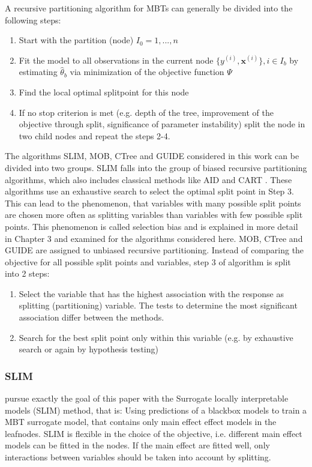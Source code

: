 A recursive partitioning algorithm for MBTs can generally be divided into the following steps:
\begin{enumerate}
    \item Start with the partition (node) $I_0 = 1,...,n$
    \item Fit the model to all observations in the current node $\{y^{(i)}, \mathbf{x}^{(i)}\}, i \in I_b$ by estimating $\hat{\theta}_b$ via minimization of the objective function $\Psi$
    \item Find the local optimal splitpoint for this node 
    \item If no stop criterion is met (e.g. depth of the tree, improvement of the objective through split, significance of parameter instability) split the node in two child nodes and repeat the steps 2-4.
\end{enumerate}


The algorithms SLIM, MOB, CTree and GUIDE considered in this work can be divided into two groups. SLIM falls into the group of biased recursive partitioning algorithms, which also includes classical methods like AID \citep{Morgan.1963} and CART \citep{Breiman.1984}. These algorithms use an exhaustive search to select the optimal split point in Step 3. This can lead to the phenomenon, that variables with many possible split points are chosen more often as splitting variables than variables with few possible split points. This phenomenon is called selection bias and is explained in more detail in Chapter 3 and examined for the algorithms considered here.
MOB, CTree and GUIDE are assigned to unbiased recursive partitioning. Instead of comparing the objective for all possible split points and variables, step 3 of algorithm is split into 2 steps:

\begin{enumerate}
    \item Select the variable that has the highest association with the response as splitting (partitioning) variable. The tests to determine the most significant association differ between the methods.
    \item Search for the best split point only within this variable (e.g. by exhaustive search or again by hypothesis testing)
\end{enumerate}

\citep{Schlosser.2019}



\subsubsection{SLIM}
\citep{Hu.2020} pursue exactly the goal of this paper with the Surrogate locally interpretable models (SLIM) method, that is: Using predictions of a blackbox models to train a MBT surrogate model, that contains only main effect effect models in the leafnodes. SLIM is flexible in the choice of the objective, i.e. different main effect models can be fitted in the nodes. If the main effect are fitted well, only interactions between variables should be taken into account by splitting. 

